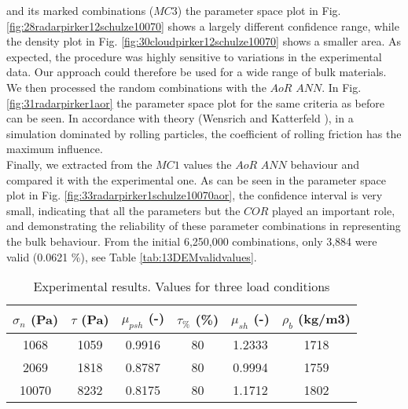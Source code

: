 \documentclass{llncs}
\begin{document}
and its marked combinations ($MC3$) the parameter space plot in Fig.
\ref{fig:28radarpirker12schulze10070} shows a largely different confidence
range, while the density plot in Fig. \ref{fig:30cloudpirker12schulze10070} 
shows a smaller area. As expected, the procedure was highly sensitive to
variations in the experimental data.
Our approach could therefore be used
for a wide range of bulk materials.\\
We then processed the random combinations with the $AoR$ $ANN$. In Fig.
\ref{fig:31radarpirker1aor} the parameter space plot for the same criteria as
before can be seen.
In accordance with theory (Wensrich and Katterfeld \cite{RefWorks:87}), in a simulation dominated
by rolling particles, the coefficient of rolling friction has the maximum
influence. \\
Finally, we extracted from the $MC1$ values the $AoR$ $ANN$ behaviour
and compared it with the experimental one.
As can be seen in the parameter space plot in Fig.
\ref{fig:33radarpirker1schulze10070aor}, the confidence interval is very small,
indicating that all the parameters but the $COR$ played an important role, 
and demonstrating the reliability of these parameter
combinations in representing the bulk behaviour.
From the initial 6,250,000 combinations, only 3,884 were valid (0.0621
\%), see Table \ref{tab:13DEMvalidvalues}.
\begin{table}[h]
\centering
\begin{tabular}{cccccc}
\hline
$\sigma_n$ (Pa) & $\tau$ (Pa) & $\mu_{psh}$ (-) & $\tau_{\%}$ (\%) &
$\mu_{sh}$ (-) & $\rho_b$ (kg/m3) \\
\hline
    1068  & 1059  & 0.9916 & 80 & 1.2333 & 1718 \\
    2069  & 1818  & 0.8787 & 80 & 0.9994 & 1759 \\
    10070 & 8232  & 0.8175 & 80 & 1.1712 & 1802 \\

\hline
\end{tabular}
\caption[Experimental results]{Experimental results. Values for three
load conditions}
\label{tab:05sinterTableExperimental}
\end{table}
\end{document}
